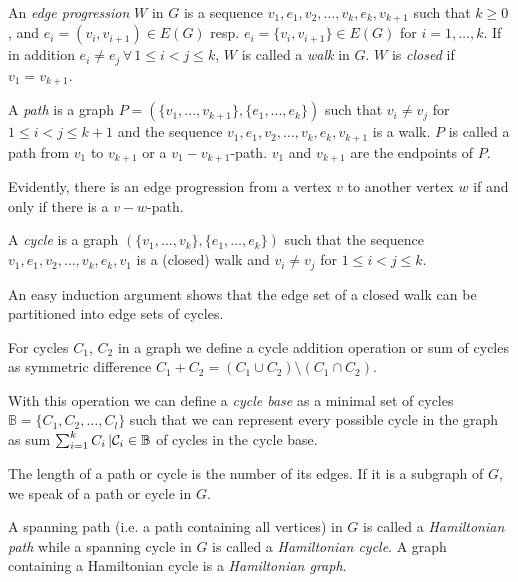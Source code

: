 \begin{definition}
An \textit{edge progression} $W$ in $G$ is a sequence $v_1, e_1, v_2, \dots , v_k, e_k, v_{k+1}$ such that $k 
\ge 0$, and $e_i = (v_i, v_{i+ 1}) \in E(G)$ resp. $e_i = \{v_i, v_{i+1}\}\in E(G)$ for $i = 1, \dots , k$. If in
addition $e_i \ne e_j \,\forall\, 1 \le i < j \le k$, $W$ is called a \textit{walk} in $G$. $W$ is \textit{closed} if
$v_1 = v_{k+1}$. 

A \textit{path} is a graph $P = (\{v_1, ... , v_{k+1}\}, \{e_1, ... , e_k\})$ such that $v_i \ne v_j$ for
$1 \le i < j \le k + 1$ and the sequence $v_1 , e_1 , v_2, \dots , v_k, e_k, v_{k+1}$ is a walk. $P$ is
called a path from $v_1$ to $v_{k+1}$ or a $v_1 - v_{k+1}$-path. $v_1$ and $v_{k+1}$ are the endpoints
of $P$.
 
\end{definition}
Evidently, there is an edge progression from a vertex $v$ to another vertex $w$ if and only if there is a $v-w$-path.
\begin{definition}

A \textit{cycle} is a graph $(\{v_1, \dots , v_k\}, \{e_1, \dots, e_k\})$ such that the sequence $v_1, e_1, v_2, 
\dots , v_k,e_k,v_1$ is a (closed) walk and $v_i \ne v_j$ for $1 \le i < j\le k$.
 
\end{definition}
An easy induction argument shows that the edge set of a closed walk can be partitioned into edge sets of cycles.

\begin{definition}
 For cycles $C_1$, $C_2$ in a graph we define a cycle addition operation or sum of cycles as symmetric difference 
 $C_1+C_2=(C_1\cup C_2)\setminus (C_1\cap C_2)$. 
 
 With this operation we can define a \textit{cycle base} as a minimal 
set of cycles $\mathbb{B}=\{C_1,C_2,\dots, C_l\}$ such that we can represent every possible cycle in the graph as sum 
$\sum_{i=1}^k C_i\,|\mathcal{C}_i\in\mathbb{B}$ of cycles in the cycle base.
\end{definition}

 
\begin{definition}
The length of a path or cycle is the number of its edges. If it is a subgraph of $G$, we speak of a path or cycle in 
$G$. 
\end{definition}

\begin{definition}
A spanning path (i.e. a path containing all vertices) in $G$ is called a \textit{Hamiltonian path} while a spanning 
cycle in $G$ is called a \textit{Hamiltonian cycle}. A graph containing a Hamiltonian cycle is a \textit{Hamiltonian 
graph}.
\end{definition}

